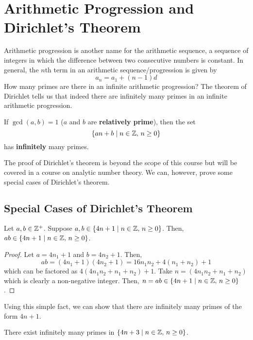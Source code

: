 \section{Arithmetic Progression and Dirichlet's Theorem}

Arithmetic progression is another name for the arithmetic sequence, a sequence of integers in which the difference between two consecutive numbers is constant. In general, the $n$th term in an arithmetic sequence/progression is given by
$$
a_n = a_1 + (n-1) d
$$
How many primes are there in an infinite arithmetic progression? The theorem of Dirichlet tells us that indeed there are infinitely many primes in an infinite arithmetic progression.

\begin{theorem}
    If $\gcd(a,b)=1$ ($a$ and $b$ are \textbf{relatively prime}), then the set
    $$
    \{ an + b \mid n \in \mathbb{Z},\, n \geq 0 \}
    $$
    has \textbf{infinitely} many primes.
\end{theorem}

The proof of Dirichlet's theorem is beyond the scope of this course but will be covered in a course on analytic number theory. We can, however, prove some special cases of Dirichlet's theorem.

\subsection{Special Cases of Dirichlet's Theorem}
\begin{lemma} \label{lem:dirichlet-special-case-lem}
    Let $a,b \in \mathbb{Z}^+$. Suppose $a,b \in \{4n+1 \mid n \in \mathbb{Z},\, n \geq 0\}$. Then, $ab \in \{4n+1 \mid n \in \mathbb{Z},\, n \geq 0\}$.
\end{lemma}

\begin{proof}
    Let $a = 4n_1 + 1$ and $b = 4n_2 + 1$. Then,
    $$
    ab = (4n_1 + 1) (4n_2 + 1) = 16n_1n_2 + 4(n_1+n_2) + 1
    $$
    which can be factored as $4(4n_1n_2 + n_1 + n_2) + 1$. Take $n = (4n_1n_2 + n_1 + n_2)$ which is clearly a non-negative integer. Then, $n = ab \in \{4n+1 \mid n \in \mathbb{Z},\, n \geq 0\}$.
\end{proof}

Using this simple fact, we can show that there are infinitely many primes of the form $4n + 1$.

\begin{proposition}
    There exist infinitely many primes in $\{ 4n+3 \mid n \in \mathbb{Z},\, n \geq 0\}$.
\end{proposition}

